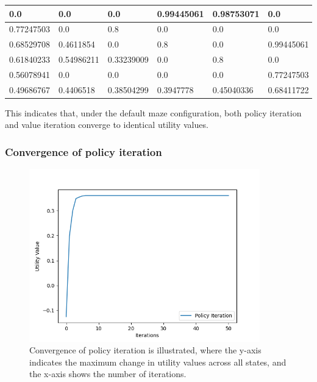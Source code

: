 \documentclass{article}
\begin{document}
\begin{table}[H]
    \begin{tabular}{|l|l|l|l|l|l|}
        \hline
        0.0        & 0.0        & 0.0        & 0.99445061 & 0.98753071 & 0.0        \\\hline
        0.77247503 & 0.0        & 0.8        & 0.0        & 0.0        & 0.0        \\\hline
        0.68529708 & 0.4611854  & 0.0        & 0.8        & 0.0        & 0.99445061 \\\hline
        0.61840233 & 0.54986211 & 0.33239009 & 0.0        & 0.8        & 0.0        \\\hline
        0.56078941 & 0.0        & 0.0        & 0.0        & 0.0        & 0.77247503 \\\hline
        0.49686767 & 0.4406518  & 0.38504299 & 0.3947778  & 0.45040336 & 0.68411722 \\\hline
    \end{tabular}
\end{table}

This indicates that, under the default maze configuration, both policy iteration and value iteration converge to identical utility values.

\subsubsection{Convergence of policy iteration}

\begin{figure}[H]
    \includegraphics[width=100mm]{../asset/policy_iteration_curve.png}
    \caption{Convergence of policy iteration is illustrated, where the y-axis indicates the maximum change in utility values across all states, and the x-axis shows the number of iterations.}
    \label{fig:policy_iteration_convergence}
\end{figure}
\end{document}
